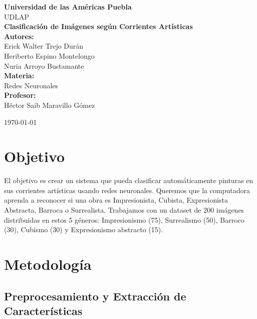 \documentclass[8pt,a4paper]{article}
\begin{document}
\begin{titlepage}
    \centering
    \vspace*{1cm}
    
    {\LARGE\textbf{Universidad de las Américas Puebla}}\\[0.5cm]
    {\large UDLAP}\\[2cm]
    
    {\Huge\textbf{Clasificación de Imágenes según Corrientes Artísticas}}\\[0.8cm]
    
    {\large\textbf{Autores:}}\\[0.3cm]
    {\large
        Erick Walter Trejo Durán\\
        Heriberto Espino Montelongo\\
        Nuria Arroyo Bustamante
    }\\[2cm]
    
    {\large\textbf{Materia:}}\\[0.2cm]
    {\large Redes Neuronales}\\[1cm]
    
    {\large\textbf{Profesor:}}\\[0.2cm]
    {\large Héctor Saib Maravillo Gómez}\\[2cm]
    
    \vfill
    
    {\large \today}
    
\end{titlepage}

\newpage

\section{Objetivo}

El objetivo es crear un sistema que pueda clasificar automáticamente pinturas en sus corrientes artísticas usando redes neuronales. Queremos que la computadora aprenda a reconocer si una obra es Impresionista, Cubista, Expresionista Abstracta, Barroca o Surrealista. Trabajamos con un dataset de 200 imágenes distribuidas en estos 5 géneros: Impresionismo (75), Surrealismo (50), Barroco (30), Cubismo (30) y Expresionismo abstracto (15).

\section{Metodología}

\subsection{Preprocesamiento y Extracción de Características}
\end{document}
